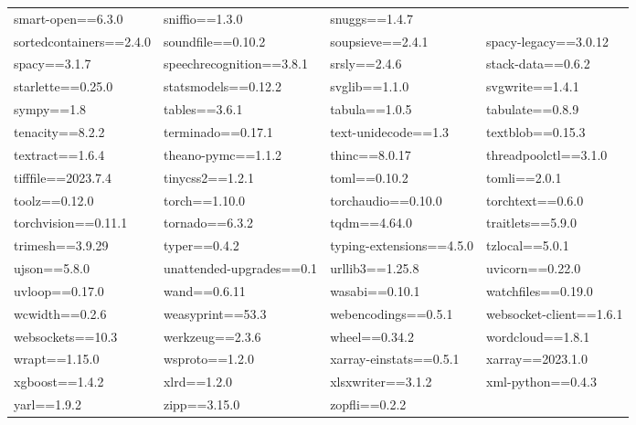 \begin{tabular}{l l l l}
smart-open==6.3.0 & sniffio==1.3.0 & snuggs==1.4.7 \\ sortedcontainers==2.4.0 & soundfile==0.10.2 & soupsieve==2.4.1 & spacy-legacy==3.0.12 \\ 
spacy==3.1.7 & speechrecognition==3.8.1 & srsly==2.4.6 & stack-data==0.6.2 \\ starlette==0.25.0 & statsmodels==0.12.2 & svglib==1.1.0 & 
svgwrite==1.4.1 \\ sympy==1.8 & tables==3.6.1 & tabula==1.0.5 & tabulate==0.8.9 \\ tenacity==8.2.2 & terminado==0.17.1 & 
text-unidecode==1.3 & textblob==0.15.3 \\ textract==1.6.4 & theano-pymc==1.1.2 & thinc==8.0.17 & threadpoolctl==3.1.0 \\ tifffile==2023.7.4 & 
tinycss2==1.2.1 & toml==0.10.2 & tomli==2.0.1 \\ toolz==0.12.0 & torch==1.10.0 & torchaudio==0.10.0 & torchtext==0.6.0 \\ 
torchvision==0.11.1 & tornado==6.3.2 & tqdm==4.64.0 & traitlets==5.9.0 \\ trimesh==3.9.29 & typer==0.4.2 & typing-extensions==4.5.0 & 
tzlocal==5.0.1 \\ ujson==5.8.0 & unattended-upgrades==0.1 & urllib3==1.25.8 & uvicorn==0.22.0 \\ uvloop==0.17.0 & wand==0.6.11 & 
wasabi==0.10.1 & watchfiles==0.19.0 \\ wcwidth==0.2.6 & weasyprint==53.3 & webencodings==0.5.1 & websocket-client==1.6.1 \\ websockets==10.3 & 
werkzeug==2.3.6 & wheel==0.34.2 & wordcloud==1.8.1 \\ wrapt==1.15.0 & wsproto==1.2.0 & xarray-einstats==0.5.1 & xarray==2023.1.0 \\ 
xgboost==1.4.2 & xlrd==1.2.0 & xlsxwriter==3.1.2 & xml-python==0.4.3 \\ yarl==1.9.2 & zipp==3.15.0 & zopfli==0.2.2 \\
\end{tabular}
